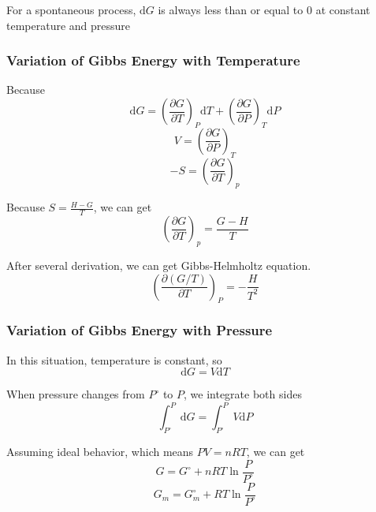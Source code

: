 \documentclass[letterpaper]{article}
\newcommand{\diff}{\mathrm{d}}
\newcommand{\zero}{^\circ}
\begin{document}
For a spontaneous process, $\diff G$ is always less than or equal to 0 at constant temperature and pressure

\subsubsection*{Variation of Gibbs Energy with Temperature}
Because
\begin{equation*}
    \diff G=(\frac{\partial G}{\partial T})_P\diff T+(\frac{\partial G}{\partial P})_T\diff P
\end{equation*}
\begin{equation*}
    V=(\frac{\partial G}{\partial P})_T
\end{equation*}
\begin{equation*}
    -S=(\frac{\partial G}{\partial T})_p
\end{equation*}

Because $S=\frac{H-G}{T}$, we can get
\begin{equation*}
    (\frac{\partial G}{\partial T})_p=\frac{G-H}{T}
\end{equation*}

After several derivation, we can get Gibbs-Helmholtz equation.
\begin{equation*}
    \boxed{(\frac{\partial (G/T)}{\partial T})_P=-\frac{H}{T^2}}
\end{equation*}

\subsubsection*{Variation of Gibbs Energy with Pressure}
In this situation, temperature is constant, so
\begin{equation*}
    \diff G=V\diff T
\end{equation*}

When pressure changes from $P\zero$ to $P$, we integrate both sides
\begin{equation*}
    \int_{P\zero}^{P}\diff G=\int_{P\zero}^{P}V\diff P
\end{equation*}

Assuming ideal behavior, which means $PV=nRT$, we can get
\begin{equation*}
    G=G\zero + nRT\ln\frac{P}{P\zero}
\end{equation*}
\begin{equation*}
    G_m=G_m\zero+RT\ln\frac{P}{P\zero}
\end{equation*}
\end{document}
